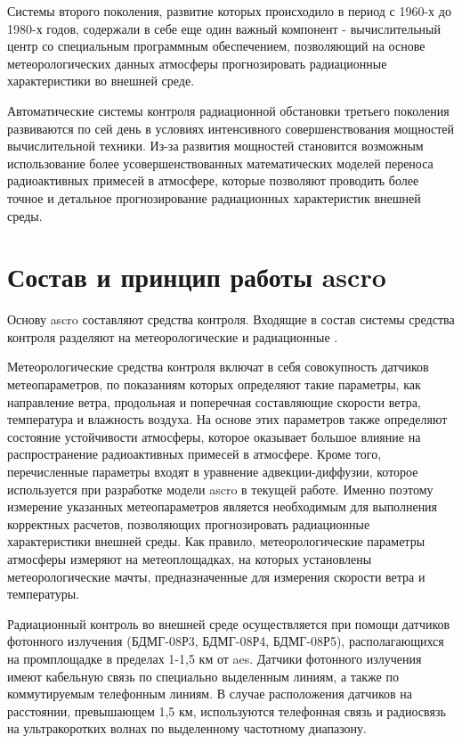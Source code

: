 Системы второго поколения, развитие которых происходило в период с 1960-х до 1980-х годов, содержали в себе еще один 
важный компонент - вычислительный центр со специальным программным обеспечением, позволяющий на основе метеорологических 
данных атмосферы прогнозировать радиационные характеристики во внешней среде. 

Автоматические системы контроля радиационной обстановки третьего поколения развиваются по сей день в условиях 
интенсивного совершенствования мощностей вычислительной техники. Из-за развития мощностей становится возможным 
использование более усовершенствованных математических моделей переноса радиоактивных примесей в атмосфере, которые 
позволяют проводить более точное и детальное прогнозирование радиационных характеристик внешней среды.

\section{Состав и принцип работы \ac{ascro}}

Основу \ac{ascro} составляют средства контроля. Входящие в состав системы средства контроля разделяют на 
метеорологические и радиационные \cite{elokhin}.

Метеорологические средства контроля включат в себя совокупность датчиков метеопараметров, по показаниям которых 
определяют такие параметры, как направление ветра, продольная и поперечная составляющие скорости ветра, температура и 
влажность воздуха. На основе этих параметров также определяют состояние устойчивости атмосферы, которое оказывает 
большое влияние на распространение радиоактивных примесей в атмосфере. Кроме того, перечисленные параметры входят в 
уравнение адвекции-диффузии, которое используется при разработке модели \ac{ascro} в текущей работе. Именно поэтому 
измерение указанных метеопараметров является необходимым для выполнения корректных расчетов, позволяющих прогнозировать 
радиационные характеристики внешней среды. Как правило, метеорологические параметры атмосферы измеряют на метеоплощадках, 
на которых установлены метеорологические мачты, предназначенные для измерения скорости ветра и температуры.

Радиационный контроль во внешней среде осуществляется при помощи датчиков фотонного излучения (БДМГ-08Р3, БДМГ-08Р4, 
БДМГ-08Р5), располагающихся на промплощадке в пределах 1-1,5 км от \ac{aes}. Датчики фотонного излучения имеют кабельную 
связь по специально выделенным линиям, а также по коммутируемым телефонным линиям. В случае расположения датчиков на 
расстоянии, превышающем 1,5 км, используются телефонная связь и радиосвязь на ультракоротких волнах по выделенному 
частотному диапазону.

